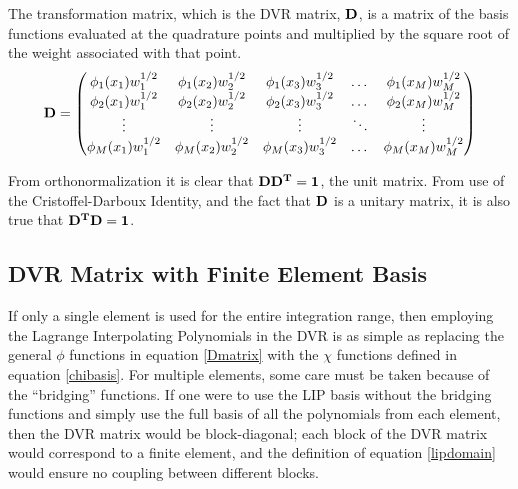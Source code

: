 \documentclass[preprint]{revtex4}
\begin{document}
The transformation matrix, which is the DVR matrix, ${\bf D}$, is a matrix
of the basis functions evaluated at the quadrature points and multiplied by the 
square root of the weight associated with that point. 
\begin{equation}
\label{Dmatrix}
{\bf D}=
\begin{pmatrix}
\phi_1(x_1)w_1^{1/2} & \phi_1(x_2)w_2^{1/2} & \phi_1(x_3)w_3^{1/2} & \dots & \phi_1(x_M)w_M^{1/2} \\
\phi_2(x_1)w_1^{1/2} & \phi_2(x_2)w_2^{1/2} & \phi_2(x_3)w_3^{1/2} & \dots & \phi_2(x_M)w_M^{1/2} \\
\vdots & \vdots  & \vdots & \ddots & \vdots \\
\phi_M(x_1)w_1^{1/2} & \phi_M(x_2)w_2^{1/2} & \phi_M(x_3)w_3^{1/2} & \dots & \phi_M(x_M)w_M^{1/2} \\
\end{pmatrix}
\end{equation}

From orthonormalization it is clear that ${\bf DD^T} = {\bf 1}$, the unit matrix. From use
of the Cristoffel-Darboux Identity\cite{CD3T}, and the fact that ${\bf D}$ is a unitary matrix, 
it is also true that ${\bf D^TD}={\bf 1}$. 

\subsection{DVR Matrix with Finite Element Basis}
If only a single element is used for the entire integration range, then employing the 
Lagrange Interpolating Polynomials in the DVR is as simple as replacing the general $\phi$
functions in equation \ref{Dmatrix} with the $\chi$ functions defined in equation \ref{chibasis}.
For multiple elements, some care must be taken because of the ``bridging'' functions. 
If one were to use the LIP basis without the bridging functions and simply use the full 
basis of all the polynomials from each element, then the DVR matrix would be block-diagonal;
each block of the DVR matrix would correspond to a finite element, and 
the definition of equation \ref{lipdomain} would ensure no 
coupling between different blocks. 
\end{document}
